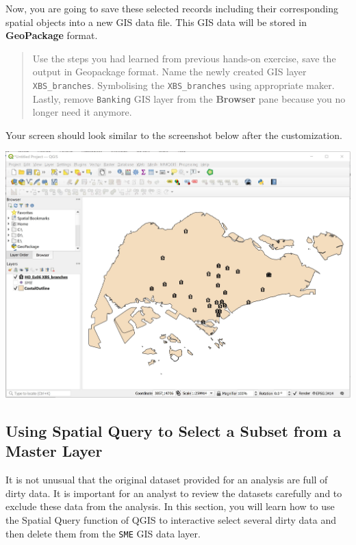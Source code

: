\documentclass[
  letterpaper,
  DIV=11,
  numbers=noendperiod]{scrreprt}
\begin{document}
Now, you are going to save these selected records including their
corresponding spatial objects into a new GIS data file. This GIS data
will be stored in \textbf{GeoPackage} format.

\begin{quote}
Use the steps you had learned from previous hands-on exercise, save the
output in Geopackage format. Name the newly created GIS layer
\texttt{XBS\_branches}. Symbolising the \texttt{XBS\_branches} using
appropriate maker. Lastly, remove \texttt{Banking} GIS layer from the
\textbf{Browser} pane because you no longer need it anymore.
\end{quote}

Your screen should look similar to the screenshot below after the
customization.

\includegraphics{./img05/image8.jpg}

\hypertarget{using-spatial-query-to-select-a-subset-from-a-master-layer}{%
\subsection{Using Spatial Query to Select a Subset from a Master
Layer}\label{using-spatial-query-to-select-a-subset-from-a-master-layer}}

It is not unusual that the original dataset provided for an analysis are
full of dirty data. It is important for an analyst to review the
datasets carefully and to exclude these data from the analysis. In this
section, you will learn how to use the Spatial Query function of QGIS to
interactive select several dirty data and then delete them from the
\texttt{SME} GIS data layer.
\end{document}
